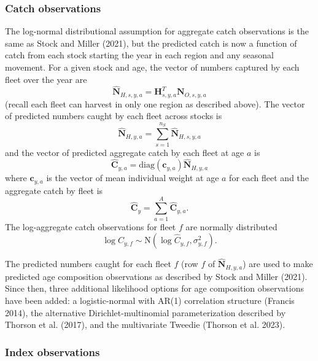\documentclass[
]{article}
\begin{document}
\hypertarget{catch-observations}{%
\subsubsection*{Catch observations}\label{catch-observations}}

The log-normal distributional assumption for aggregate catch observations is the same as Stock and Miller (2021), but the predicted catch is now a function of catch from each stock starting the year in each region and any seasonal movement. For a given stock and age, the vector of numbers captured by each fleet over the year are
\[\widehat{\mathbf{N}}_{H,s,y,a} = \mathbf{H}_{s,y,a}^T \mathbf{N}_{O,s,y,a}\]
(recall each fleet can harvest in only one region as described above). The vector of predicted numbers caught by each fleet across stocks is
\[\widehat{\mathbf{N}}_{H,y,a} = \sum^{n_S}_{s=1} \widehat{\mathbf{N}}_{H,s,y,a}\]
and the vector of predicted aggregate catch by each fleet at age \(a\) is
\[\widehat{\mathbf{C}}_{y,a} = \text{diag}\left(\mathbf{c}_{y,a}\right) \widehat{\mathbf{N}}_{H,y,a}\]
where \(\mathbf{c}_{y,a}\) is the vector of mean individual weight at age \(a\) for each fleet and the aggregate catch by fleet is
\[\widehat{\mathbf{C}}_y = \sum^{A}_{a=1} \widehat{\mathbf{C}}_{y,a}.\]
The log-aggregate catch observations for fleet \(f\) are normally distributed
\[ \log C_{y,f} \sim \text{N}\left(\log \widehat {C}_{y,f}, \sigma^2_{y,f}\right).\]

The predicted numbers caught for each fleet \(f\) (row \(f\) of \(\widehat{\mathbf{N}}_{H,y,a}\)) are used to make predicted age composition observations as described by Stock and Miller (2021). Since then, three additional likelihood options for age composition observations have been added: a logistic-normal with AR(1) correlation structure (Francis 2014), the alternative Dirichlet-multinomial parameterization described by Thorson et al. (2017), and the multivariate Tweedie (Thorson et al. 2023).

\hypertarget{index-observations}{%
\subsubsection*{Index observations}\label{index-observations}}
\end{document}
